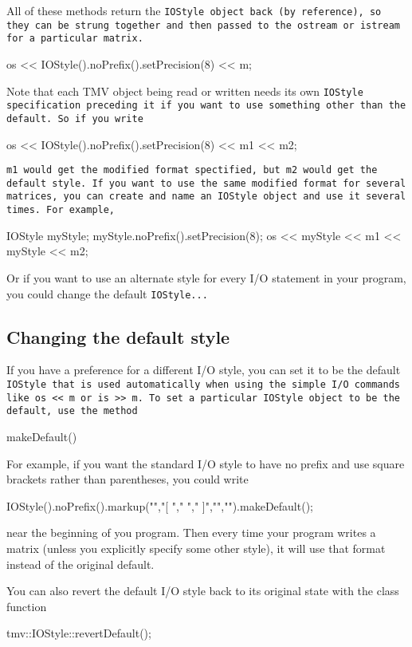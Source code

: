 All of these methods return the \tt{IOStyle} object back (by reference), so they can be strung together and then passed to the \tt{ostream} or \tt{istream} for a particular matrix.
\begin{tmvcode}
os << IOStyle().noPrefix().setPrecision(8) << m;
\end{tmvcode}

Note that each TMV object being read or written needs its own \tt{IOStyle} specification preceding it if you want to use something other than the default.  So if you write
\begin{tmvcode}
os << IOStyle().noPrefix().setPrecision(8) << m1 << m2;
\end{tmvcode}
\tt{m1} would get the modified format spectified, but \tt{m2} would get the default style.  If you want to use the same modified format for several matrices, you can create and name an \tt{IOStyle} object and use it several times. For example,
\begin{tmvcode}
IOStyle myStyle;
myStyle.noPrefix().setPrecision(8);
os << myStyle << m1 << myStyle << m2;
\end{tmvcode}

Or if you want to use an alternate style for every I/O statement in your program, you could change the default \tt{IOStyle}...

\subsection{Changing the default style}
\label{IOStyleDefault}

If you have a preference for a different I/O style, you can set it to be the default \tt{IOStyle} that is used automatically when using the simple I/O commands like \tt{os << m} or \tt{is >> m}.  To set a particular \tt{IOStyle} object to be the default, use the method
\begin{tmvcode}
makeDefault()
\end{tmvcode}
For example, if you want the standard I/O style to have no prefix and use square brackets rather than parentheses, you could write
\begin{tmvcode}
IOStyle().noPrefix().markup("","[ ","  "," ]","\n","\n").makeDefault();
\end{tmvcode}
near the beginning of you program.  Then every time your program writes a matrix (unless you explicitly specify some other style), it will use that format instead of the original default.

You can also revert the default I/O style back to its original state with the class function
\begin{tmvcode}
tmv::IOStyle::revertDefault();
\end{tmvcode}

